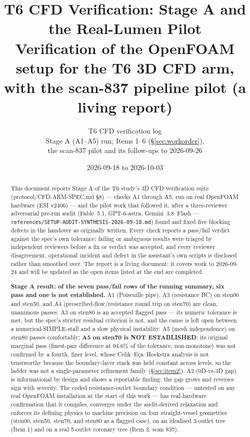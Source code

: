 \documentclass[11pt]{article}
\title{T6 CFD Verification: Stage A and the Real-Lumen Pilot\\
\large Verification of the OpenFOAM setup for the T6 3D CFD arm, with the scan-837 pipeline pilot (a living report)}
\author{T6 CFD verification log\\ Stage A (A1--A5) run; Items 1--6 (\S\ref{sec:workorder}),\\ the scan-837 pilot and its follow-ups to 2026-09-26}
\date{2026-09-18 to 2026-10-03}
\begin{document}
\maketitle

\begin{abstract}
This document reports Stage A of the T6 study's 3D CFD verification suite (protocol/CFD-ARM-SPEC.md \S8) --- checks A1 through A5, run on real OpenFOAM hardware (ESI v2406) --- and the pilot work that followed it, after a three-reviewer adversarial pre-run audit (Fable~5.1, GPT-6-astra, Gemini~3.8~Flash --- \texttt{references/\allowbreak{}SETUP-AUDIT-SYNTHESIS-2026-09-18.md}) found and fixed five blocking defects in the handover as originally written. Every check reports a pass/fail verdict against the spec's own tolerance; failing or ambiguous results were triaged by independent reviewers before a fix or verdict was accepted, and every reviewer disagreement, operational incident and defect in the assistant's own scripts is disclosed rather than smoothed over. The report is a living document: it covers work to 2026-09-24 and will be updated as the open items listed at the end are completed.

\textbf{Stage A result: of the seven pass/fail rows of the running summary, six pass and one is not established.} A1 (Poiseuille pipe), A3 (resistance BC) on sten00 and sten50, and A4 (prescribed-flow/resistance round trip on sten70) are clean, unanimous passes. A3 on sten80 is an accepted flagged pass --- its numeric tolerance is met, but the spec's stricter residual criterion is not, and the cause is left open between a numerical-SIMPLE-stall and a slow physical instability. A5 (mesh independence) on sten80 passes comfortably; \textbf{A5 on sten70 is NOT ESTABLISHED}: its original marginal pass (finest-pair difference at 94.6\% of the tolerance, non-monotone) was not confirmed by a fourth, finer level, whose Celik--Eça--Hoekstra analysis is not trustworthy because the boundary-layer stack was held constant across levels, so the ladder was not a single-parameter refinement family (\S\ref{sec:item2}). A2 (0D-vs-3D gap) is informational by design and shows a reportable finding: the gap grows and reverses sign with severity. The coded resistance-outlet boundary condition --- untested on any real OpenFOAM installation at the start of this work --- has real-hardware confirmation that it compiles, converges under the audit-derived relaxation and enforces its defining physics to machine precision on four straight-vessel geometries (sten00, sten50, sten70, and sten80 as a flagged case), on an idealised 3-outlet tree (Item 1) and on a real 5-outlet coronary tree (Item 3, scan 837).


\end{abstract}
\end{document}
